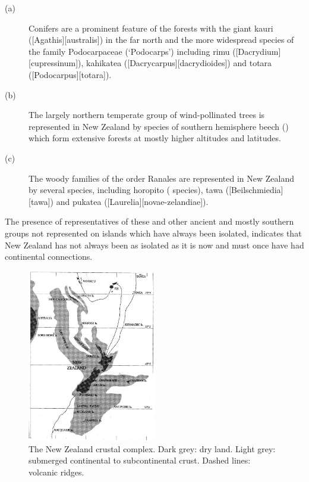 \begin{description}
\item[{(a)}]Conifers are a prominent feature of the forests with the giant kauri ([Agathis][australis]) in the far north and the more widespread species of the family Podocarpaceae (`Podocarps') including rimu ([Dacrydium][cupressinum]), kahikatea ([Dacrycarpus][dacrydioides]) and totara ([Podocarpus][totara]).
\item[{(b)}]The largely northern temperate group of wind-pollinated trees is represented in New Zealand by species of southern hemisphere beech () which form extensive forests at mostly higher altitudes and latitudes.
\item[{(c)}]The woody families of the order Ranales are represented in New Zealand by several species, including horopito ( species), tawa ([Beilschmiedia][tawa]) and pukatea ([Laurelia][novae-zelandiae]).
\end{description}

The presence of representatives of these and other ancient and mostly southern groups not represented on islands which have always been isolated, indicates that New Zealand has not always been as isolated as it is now and must once have had continental connections.

\begin{figure}
	\includegraphics[width=0.5\textwidth]{graphics/figure2crust.jpg}
	\centering
	\caption[The New Zealand crustal complex]{The New Zealand crustal complex.
Dark grey: dry land.
Light grey: submerged continental to subcontinental crust.
Dashed lines: volcanic ridges.}%
	\label{fig:2crust}
\end{figure}

